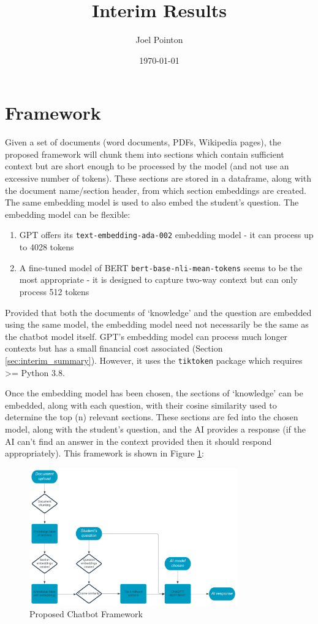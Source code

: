 \documentclass{article}
\title{\vspace{-1.3cm}Interim Results}
\author{Joel Pointon}
\date{\today}
\begin{document}
\maketitle
\section{Framework}\label{sec:inital_framework}
Given a set of documents (word documents, PDFs, Wikipedia pages), the proposed framework will chunk them into sections which contain sufficient context but are short enough to be processed by the model (and not use an excessive number of tokens). These sections are stored in a dataframe, along with the document name/section header, from which section embeddings are created. The same embedding model is used to also embed the student's question. The embedding model can be flexible:

\begin{enumerate}
    \item GPT offers its \texttt{text-embedding-ada-002} embedding model - it can process up to 4028 tokens
    \item A fine-tuned model of BERT \texttt{bert-base-nli-mean-tokens} seems to be the most appropriate - it is designed to capture two-way context but can only process 512 tokens
\end{enumerate}

Provided that both the documents of `knowledge' and the question are embedded using the same model, the embedding model need not necessarily be the same as the chatbot model itself. GPT's embedding model can process much longer contexts but has a small financial cost associated (Section \ref{sec:interim_summary}). However, it uses the \texttt{tiktoken} package which requires >= Python 3.8.

Once the embedding model has been chosen, the sections of `knowledge' can be embedded, along with each question, with their cosine similarity used to determine the top (n) relevant sections. These sections are fed into the chosen model, along with the student's question, and the AI provides a response (if the AI can't find an answer in the context provided then it should respond appropriately). This framework is shown in Figure \ref{fig:initial_framework}:

\begin{figure}[h!]
    \centering
    \includegraphics[width=0.8\textwidth]{images/framework.png}
    \caption{Proposed Chatbot Framework}
    \label{fig:initial_framework}
\end{figure}
\end{document}
